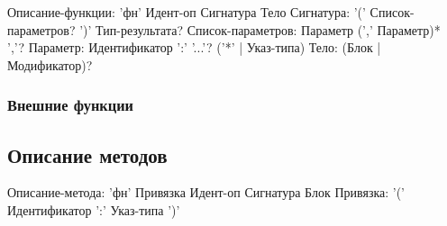 \begin{Grammar}
Описание-функции: 'фн' Идент-оп Сигнатура Тело
Сигнатура: '(' Список-параметров? ')' Тип-результата?
Список-параметров: Параметр (',' Параметр)* ','?
Параметр: Идентификатор ':' '...'? ('*' | Указ-типа)  
Тело: (Блок | Модификатор)?
\end{Grammar} 

\hypertarget{extern-fn}{%
\subsubsection{Внешние функции}\label{decls:extern-fn}}


\hypertarget{methods}{%
\subsection{Описание методов}\label{decls:methods}}

\begin{Grammar}
Описание-метода: 'фн' Привязка Идент-оп Сигнатура Блок
Привязка: '(' Идентификатор ':' Указ-типа ')'
\end{Grammar} 